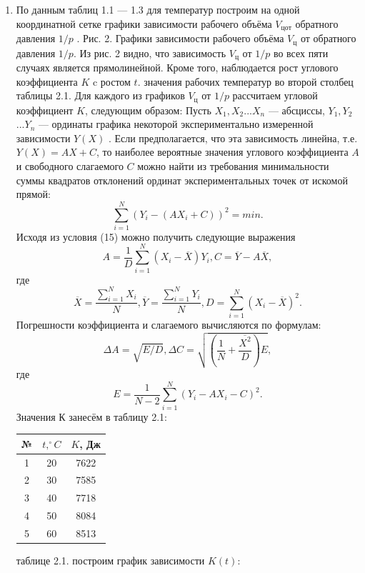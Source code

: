 \documentclass[12pt]{article}
\begin{document}
\begin{enumerate}
\item По данным таблиц 1.1 — 1.3 для температур  построим на одной координатной сетке графики зависимости рабочего объёма $V_{цот}$ обратного давления $1/p$ . 
\newpage
Рис. 2. Графики зависимости рабочего объёма $V_{ц}$ от обратного давления $1/p$. 
Из рис. 2 видно, что зависимость $V_{ц}$ от $1/p$ во всех пяти случаях является прямолинейной. Кроме того, наблюдается рост углового коэффициента $K$ c ростом $t$.
 значения рабочих температур   во второй столбец таблицы 2.1. Для каждого из графиков $V_{ц}$ от $1/p$ рассчитаем угловой коэффициент $K$, следующим образом:   
Пусть $X_{1},X_{2}$...$X_{n}$  --- абсциссы, $Y_{1},Y_{2}$...$Y_{n}$ --- ординаты графика некоторой
экспериментально измеренной зависимости $Y(X)$ . Если предполагается, что
эта зависимость линейна, т.е. $Y(X) = AX + C$, то наиболее вероятные
значения углового коэффициента $A$ и свободного слагаемого $C$ можно найти
из требования минимальности суммы квадратов отклонений ординат
экспериментальных точек от искомой прямой:
\begin{equation}
\sum_{i=1}^N( Y_{i} - (AX_{i} + C))^2 = min.
\end{equation}
Исходя из условия (15) можно получить следующие выражения
\begin{equation}
A = \frac{1}{D}\sum_{i=1}^N( X_{i} - \overline{X}) Y_{i}, C = \overline{Y} - A\overline{X},
\end{equation}
где 
\begin{equation}
\overline{X}=\frac{\sum_{i=1}^N X_{i}}{N},\overline{Y}=\frac{\sum_{i=1}^N Y_{i}}{N},D=\sum_{i=1}^N (X_{i} - \overline{X})^2.
\end{equation}
Погрешности коэффициента и слагаемого вычисляются по формулам:
\begin{equation}
\Delta A = \sqrt{E/D}, \Delta C = \sqrt{(\frac{1}{N} + \frac{\overline{X^2}}{D})E},
\end{equation}
где  
\begin{equation}
E=\frac{1}{N-2}\sum_{i=1}^N (Y_{i} - AX_{i} -C)^2.
\end{equation}
Значения $К$ занесём в таблицу 2.1:
\begin{table}[h!]
\begin{center}
\begin{tabular}{|c|c|c|}
\hline
№&	$t,^{\circ}C$&	$K$, Дж\\
\hline
1&	20&	7622\\
\hline
2&	30	&7585\\
\hline
3&	40&	7718\\
\hline
4&	50&	8084\\
\hline
5&  60	&       8513\\
\hline
\end{tabular}
\end{center}
\end{table} 	
\newpage
{} таблице 2.1. построим график зависимости $K(t)$: 


\end{enumerate}
\end{document}
